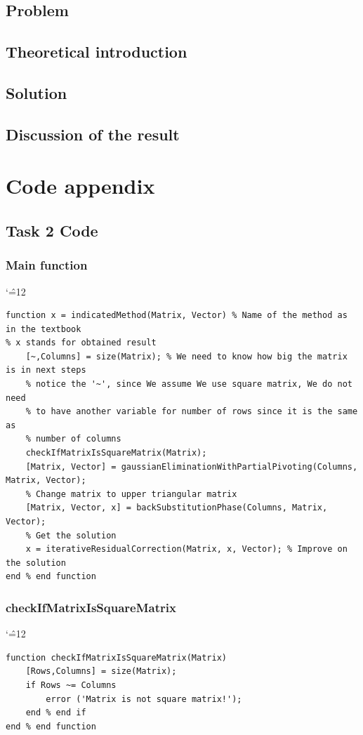\documentclass[12pt]{report}
\newenvironment{simplechar}{%
   \catcode`\^=12
}{}
\begin{document}
\section{Problem}

\section{Theoretical introduction}

\section{Solution}

\section{Discussion of the result}

\chapter{Code appendix}

\section{Task 2 Code}

\subsection{Main function}
\begin{simplechar}
\begin{lstlisting}
function x = indicatedMethod(Matrix, Vector) % Name of the method as in the textbook
% x stands for obtained result
    [~,Columns] = size(Matrix); % We need to know how big the matrix is in next steps
    % notice the '~', since We assume We use square matrix, We do not need
    % to have another variable for number of rows since it is the same as
    % number of columns
    checkIfMatrixIsSquareMatrix(Matrix);
    [Matrix, Vector] = gaussianEliminationWithPartialPivoting(Columns, Matrix, Vector);
    % Change matrix to upper triangular matrix
    [Matrix, Vector, x] = backSubstitutionPhase(Columns, Matrix, Vector);
    % Get the solution
    x = iterativeResidualCorrection(Matrix, x, Vector); % Improve on the solution
end % end function
\end{lstlisting}
\end{simplechar}

\subsection{checkIfMatrixIsSquareMatrix}
\begin{simplechar}
\begin{lstlisting}
function checkIfMatrixIsSquareMatrix(Matrix)
    [Rows,Columns] = size(Matrix);
    if Rows ~= Columns
        error ('Matrix is not square matrix!');
    end % end if
end % end function
\end{lstlisting}
\end{simplechar}
\end{document}
